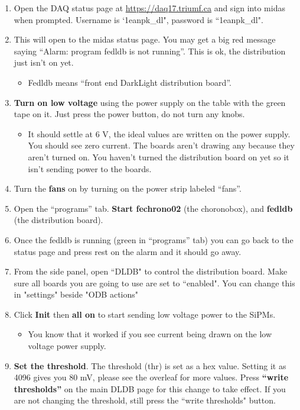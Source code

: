 \documentclass{article}
\begin{document}
\begin{enumerate}
    \item Open the DAQ status page at \url{https://daq17.triumf.ca} and sign into midas when prompted. Username is `1eanpk\_dl", password is ``1eanpk\_dl".
    \item This will open to the midas status page. You may get a big red message saying “Alarm: program fedldb is not running”. This is ok, the distribution just isn't on yet.
    \begin{itemize}
        \item Fedldb means “front end DarkLight distribution board”.
    \end{itemize}
    \item \textbf{Turn on low voltage} using the power supply on the table with the green tape on it. Just press the power button, do not turn any knobs. 
    \begin{itemize}
        \item It should settle at 6 V, the ideal values are written on the power supply. You should see zero current. The boards aren't drawing any because they aren't turned on. You haven't turned the distribution board on yet so it isn't sending power to the boards.
    \end{itemize}
    \item Turn the \textbf{fans} on by turning on the power strip labeled “fans”.
    \item Open the “programs” tab. \textbf{Start fechrono02} (the choronobox), and \textbf{fedldb} (the distribution board).
    \item Once the fedldb is running (green in “programs” tab) you can go back to the status page and press rest on the alarm and it should go away.
    \item From the side panel, open ``DLDB" to control the distribution board. Make sure all boards you are going to use are set to ``enabled". You can change this in "settings" beside "ODB actions"
    \item Click \textbf{Init} then \textbf{all on} to start sending low voltage power to the SiPMs. 
    \begin{itemize}
        \item You know that it worked if you see current being drawn on the low voltage power supply.
    \end{itemize}
    \item \textbf{Set the threshold}. The threshold (thr) is set as a hex value. Setting it as 4096 gives you 80 mV, please see the overleaf for more values. Press \textbf{“write thresholds”} on the main DLDB page for this change to take effect. If you are not changing the threshold, still press the ``write thresholds" button.

\end{enumerate}
\end{document}
